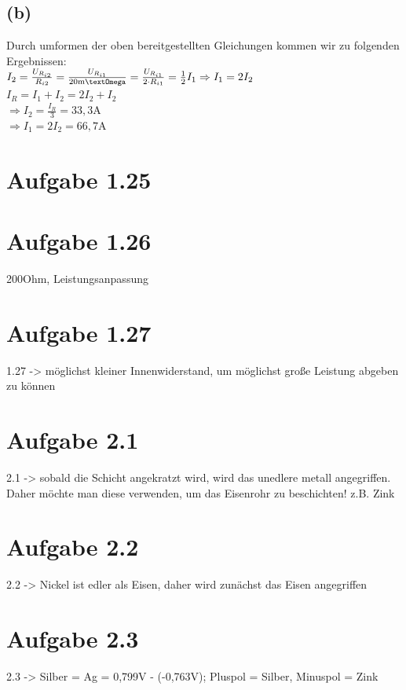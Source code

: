 \documentclass[]{article}
\newcommand{\rarr}{\Rightarrow}
\newcommand{\unit}[1]{\text{#1}}
\begin{document}
\subsection*{(b)}
	Durch umformen der oben bereitgestellten Gleichungen kommen wir zu folgenden Ergebnissen:\\
	$I_2 = \frac{U_{R_{i2}}}{R_{i2}} = \frac{U_{R_{i1}}}{20\unit{m\textOmega}} = \frac{U_{R_{i1}}}{2 \cdot R_{i1}} = \frac{1}{2}I_1 \rarr I_1 = 2I_2$\\
	$I_R = I_1 + I_2 = 2I_2 + I_2$\\
	$\rarr I_2 = \frac{I_R}{3} = 33,3\unit{A}$\\
	$\rarr I_1 = 2I_2 = 66,7\unit{A}$\\

\section*{Aufgabe 1.25}
\par
\section*{Aufgabe 1.26}
\par
	200Ohm, Leistungsanpassung
\section*{Aufgabe 1.27}
\par
	1.27 -> möglichst kleiner Innenwiderstand, um möglichst große Leistung abgeben zu können
\section*{Aufgabe 2.1}
	2.1 -> sobald die Schicht angekratzt wird, wird das unedlere metall angegriffen. Daher möchte man diese verwenden, um das Eisenrohr zu beschichten! z.B. Zink
\section*{Aufgabe 2.2}
\par
	2.2 -> Nickel ist edler als Eisen, daher wird zunächst das Eisen angegriffen
\section*{Aufgabe 2.3}
\par
	2.3 -> Silber = Ag = 0,799V - (-0,763V); Pluspol = Silber, Minuspol = Zink
\end{document}
